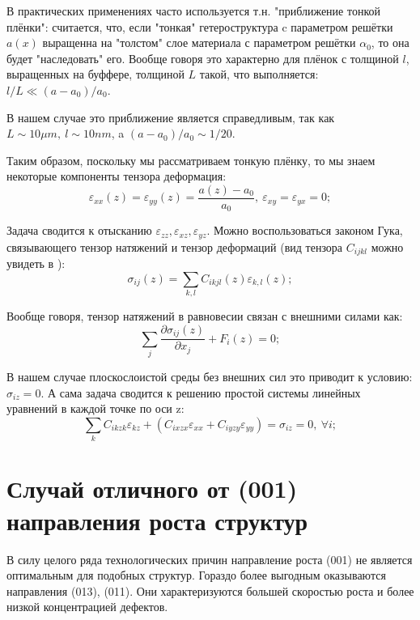 \documentclass[../main.tex]{subfiles}
\newcommand{\vep}{\varepsilon}
\begin{document}
    В практических применениях часто используется т.н. "приближение тонкой плёнки":
    считается, что, если "тонкая" гетероструктура c параметром решётки $a(x)$ выращенна 
    на "толстом" слое материала с параметром решётки $\alpha_0$, то она будет "наследовать"
    его. Вообще говоря это характерно для плёнок с толщиной $l$, выращенных на буффере, 
    толщиной $L$ такой, что выполняется: $l / L \ll (a - a_0) / a_0$.

    В нашем случае это приближение является справедливым, так как 
    $L \sim 10 \mu m,~l \sim 10 nm$, a $(a - a_0) / a_0 \sim 1 / 20$. 

    Таким образом, поскольку мы рассматриваем тонкую плёнку, то мы знаем
    некоторые компоненты тензора деформация:
    \begin{equation}
        \label{well_known_components}
        \vep_{xx}(z) = \vep_{yy}(z) = \frac{a(z) - a_0}{a_0},~\vep_{xy} = \vep_{yx} = 0;
    \end{equation}

    Задача сводится к отысканию $\vep_{zz},\vep_{xz},\vep_{yz}$. 
    Можно воспользоваться законом Гука, связывающего тензор натяжений 
    и тензор деформаций (вид тензора $C_{ijkl}$ можно увидеть в \cite{Landau:Upr:1965}):
    \begin{equation}
        \label{gook_law}
        \sigma_{ij}(z) = \sum_{k,l} C_{ikjl}(z) \vep_{k,l}(z);
    \end{equation}

    Вообще говоря, тензор натяжений в равновесии связан с внешними силами как:
    \begin{equation}
        \sum_j \frac{\partial \sigma_{ij}(z)}{\partial x_j} + F_i(z) = 0;
    \end{equation}

    В нашем случае плоскослоистой среды без внешних сил это приводит к условию:
    $\sigma_{iz} = 0$. А сама задача сводится к решению простой системы линейных
    уравнений в каждой точке по оси z:
    \begin{equation}
        \sum_k C_{ikzk} \vep_{kz} + (C_{ixzx} \vep_{xx} + C_{iyzy} \vep_{yy})  = 
            \sigma_{iz} = 0, ~\forall i;
    \end{equation}

    \section{Случай отличного от (001) направления роста структур}

    В силу целого ряда технологических причин направление роста (001)
    не является оптимальным для подобных структур. Гораздо более выгодным оказываются
    направления (013), (011). Они характеризуются большей скоростью роста 
    и более низкой концентрацией дефектов.
\end{document}
